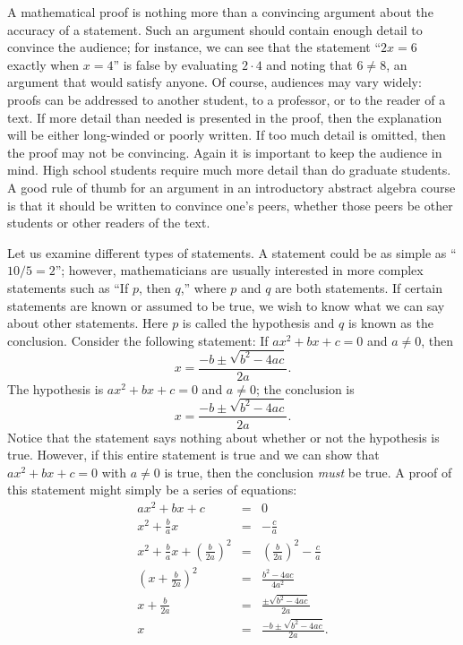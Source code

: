A {\bfi mathematical proof\/} is nothing more than a convincing argument about the accuracy  of a statement. Such an argument should contain enough detail to convince the audience; for instance, we can see that the statement ``$2x=6$ exactly when $x = 4$'' is false by evaluating $2 \cdot 4$ and noting that $6 \neq 8$, an argument that would satisfy anyone. Of course, audiences may vary widely: proofs can be addressed to another student, to a professor, or to the reader of a text.  If more detail than  needed is presented in the proof, then the  explanation will be either long-winded or poorly written.  If too much detail is omitted, then the proof may  not be convincing.  Again it is important to keep the audience in mind.  High school students require much more detail than do graduate students.  A good rule of thumb for an argument in an introductory abstract algebra course is that it should be written to convince one's peers, whether those peers be other students or other readers of the text. 
 
 
Let us examine different types of statements.  A statement could be as simple as ``$10/5 = 2$''; however, mathematicians are usually interested in more complex statements such as ``If $p$, then $q$,'' where $p$ and $q$ are both statements.  If certain statements are known or assumed to be true, we wish to know what we can say about other statements.  Here $p$ is called the {\bfi hypothesis\/} and $q$ is known as the {\bfi conclusion}.  Consider the following statement: If $ax^2 + bx + c = 0$ and $a \neq 0$, then  
$$
x = \frac{-b \pm \sqrt{b^2 - 4ac}}{2a}.
$$
The hypothesis is $ax^2 + bx + c = 0$ and $a \neq 0$; the conclusion is 
$$
x = \frac{-b \pm \sqrt{b^2 - 4ac}}{2a}.
$$
Notice that the  statement says nothing about whether or not the hypothesis is true. However, if this entire statement is true and we can show that $ax^2 + bx + c = 0$ with $a \neq 0$ is true, then the conclusion {\em must\/} be true.  A proof of this statement might simply be a series of equations: 
\begin{eqnarray*}
ax^2 + bx + c & = & 0 \\
x^2 + \frac{b}{a}x & = & - \frac{c}{a} \\
x^2 + \frac{b}{a}x + \left( \frac{b}{2a} \right)^2
& = & \left( \frac{b}{2a} \right)^2 - \frac{c}{a} \\
\left(x + \frac{b}{2a} \right)^2
& = & \frac{b^2 - 4ac}{4a^2} \\
x + \frac{b}{2a}  & = & \frac{ \pm \sqrt{ b^2 -4ac}}{2a} \\
x & = & \frac{-b \pm \sqrt{b^2 - 4ac}}{2a}.
\end{eqnarray*}

